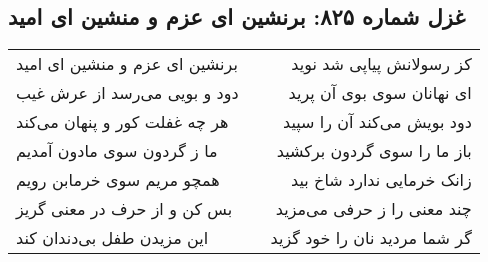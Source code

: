 \begin{center}
\section*{غزل شماره ۸۲۵: برنشین ای عزم و منشین ای امید}
\label{sec:0825}
\begin{longtable}{l p{0.5cm} r}
برنشین ای عزم و منشین ای امید
&&
کز رسولانش پیاپی شد نوید
\\
دود و بویی می‌رسد از عرش غیب
&&
ای نهانان سوی بوی آن پرید
\\
هر چه غفلت کور و پنهان می‌کند
&&
دود بویش می‌کند آن را سپید
\\
ما ز گردون سوی مادون آمدیم
&&
باز ما را سوی گردون برکشید
\\
همچو مریم سوی خرمابن رویم
&&
زانک خرمایی ندارد شاخ بید
\\
بس کن و از حرف در معنی گریز
&&
چند معنی را ز حرفی می‌مزید
\\
این مزیدن طفل بی‌دندان کند
&&
گر شما مردید نان را خود گزید
\\
\end{longtable}
\end{center}
